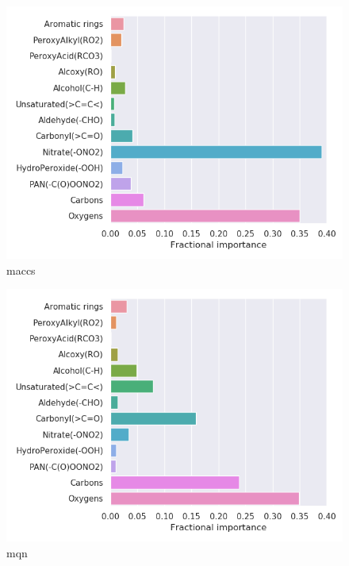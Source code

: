 \begin{subfigure}[b]{0.46\textwidth}
    \centering
    \includegraphics[width=\textwidth]{outputs/AE/maccs/legend.png}
    \caption{maccs}
    \label{fig:legend_AE_maccs}
\end{subfigure}
\begin{subfigure}[b]{0.46\textwidth}
    \centering
    \includegraphics[width=\textwidth]{outputs/AE/mqn/legend.png}
    \caption{mqn}
    \label{fig:legend_AE_mqn}
\end{subfigure}\\

